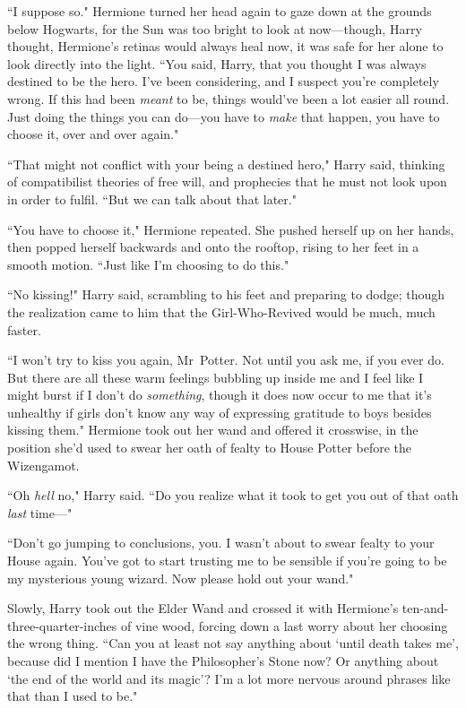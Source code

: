 ``I suppose so." Hermione turned her head again to gaze down at the grounds below Hogwarts, for the Sun was too bright to look at now—though, Harry thought, Hermione's retinas would always heal now, it was safe for her alone to look directly into the light. ``You said, Harry, that you thought I was always destined to be the hero. I've been considering, and I suspect you're completely wrong. If this had been \emph{meant} to be, things would've been a lot easier all round. Just doing the things you can do—you have to \emph{make} that happen, you have to choose it, over and over again."

``That might not conflict with your being a destined hero," Harry said, thinking of compatibilist theories of free will, and prophecies that he must not look upon in order to fulfil. ``But we can talk about that later."

``You have to choose it," Hermione repeated. She pushed herself up on her hands, then popped herself backwards and onto the rooftop, rising to her feet in a smooth motion. ``Just like I'm choosing to do this."

``No kissing!" Harry said, scrambling to his feet and preparing to dodge; though the realization came to him that the Girl-Who-Revived would be much, much faster.

``I won't try to kiss you again, Mr~Potter. Not until you ask me, if you ever do. But there are all these warm feelings bubbling up inside me and I feel like I might burst if I don't do \emph{something}, though it does now occur to me that it's unhealthy if girls don't know any way of expressing gratitude to boys besides kissing them." Hermione took out her wand and offered it crosswise, in the position she'd used to swear her oath of fealty to House Potter before the Wizengamot.

``Oh \emph{hell} no," Harry said. ``Do you realize what it took to get you out of that oath \emph{last} time—"

``Don't go jumping to conclusions, you. I wasn't about to swear fealty to your House again. You've got to start trusting me to be sensible if you're going to be my mysterious young wizard. Now please hold out your wand."

Slowly, Harry took out the Elder Wand and crossed it with Hermione's ten-and-three-quarter-inches of vine wood, forcing down a last worry about her choosing the wrong thing. ``Can you at least not say anything about `until death takes me', because did I mention I have the Philosopher's Stone now? Or anything about `the end of the world and its magic'? I'm a lot more nervous around phrases like that than I used to be."

